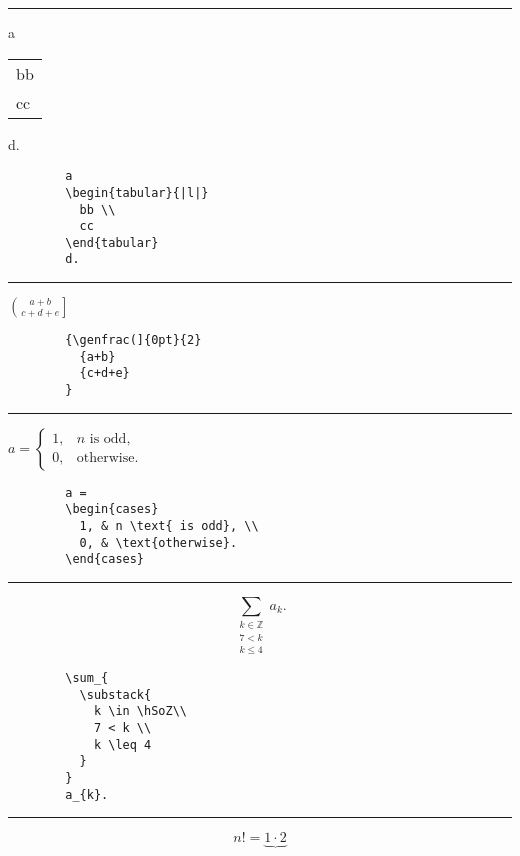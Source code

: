 \documentclass[a4paper,10pt,landscape]{article}
\newcommand{\hSep}{{\color{colorSep}\hrule}}
\theoremstyle{definition}
\theoremstyle{remark}
\newcommand{\hSoZ}  {\ensuremath{\mathbb{Z}}}      %
\begin{document}
\begin{multicols}{3}
\hSep
\begin{multicols}{2}
		a
		\begin{tabular}{|l|}
		  bb \\
		  cc
		\end{tabular}
		d.
\columnbreak
	\begin{verbatim}
		a
		\begin{tabular}{|l|}
		  bb \\
		  cc
		\end{tabular}
		d.
	\end{verbatim}
\end{multicols}
\hSep
\begin{multicols}{2}
	 $
		{\genfrac(]{0pt}{2}
		  {a+b}
		  {c+d+e}
		}
	 $
\columnbreak
	\begin{verbatim}
		{\genfrac(]{0pt}{2}
		  {a+b}
		  {c+d+e}
		}
	\end{verbatim}
\end{multicols}
\hSep
\begin{multicols}{2}
	$
		a = 
		\begin{cases}
		  1, & n \text{ is odd}, \\
		  0, & \text{otherwise}.
		\end{cases}
	$
\columnbreak
	\begin{verbatim}
		a = 
		\begin{cases}
		  1, & n \text{ is odd}, \\
		  0, & \text{otherwise}.
		\end{cases}
	\end{verbatim}
\end{multicols}
\hSep
\begin{multicols}{2}
	\[
		\sum_{
		  \substack{
		    k \in \hSoZ\\ 
		    7 < k \\ 
		    k \leq 4
		  }
		} 
		a_{k}.
	\]
\columnbreak
	\begin{verbatim}
		\sum_{
		  \substack{
		    k \in \hSoZ\\ 
		    7 < k \\ 
		    k \leq 4
		  }
		} 
		a_{k}.
	\end{verbatim}
\end{multicols}
\hSep
\begin{multicols}{2}
	\[
		n! = 
		\underbrace{
		  1
		  \cdot 2 
}\]
\end{multicols}
\end{multicols}
\end{document}
